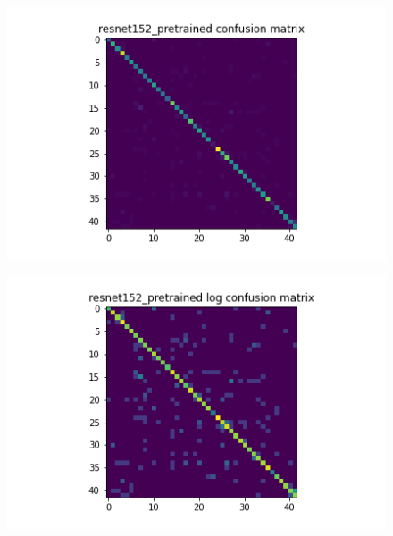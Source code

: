 \begin{figure}[H]
  \begin{minipage}[b]{.5\linewidth}
    \centering
    {\includegraphics[width=1.2\textwidth]{figs/conf_matrix/resnet152_pretrained_conf.png}}
  \end{minipage}
  \hfill
  \begin{minipage}[b]{.5\linewidth}
    \centering

    {\includegraphics[width=1.2\textwidth]{figs/conf_matrix/resnet152_pretrained_log_conf.png}}
  \end{minipage}
  \vfill
  \begin{minipage}[b]{.5\linewidth}
    \centering


\end{minipage}
\end{figure}
